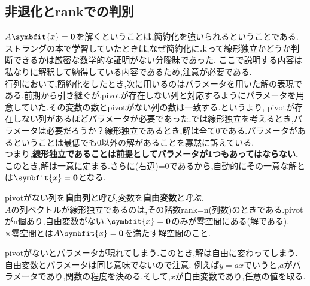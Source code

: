 \subsection{非退化とrankでの判別}\label{sub:nondegenerate}
$A\symbfit{x}=\mathbf{0}$を解くということは,簡約化を強いられるということである.
ストラングの本で学習していたときは,なぜ簡約化によって線形独立かどうか判断できるかは厳密な数学的な証明がない分曖昧であった.
ここで説明する内容は私なりに解釈して納得している内容であるため,注意が必要である.\\
行列において,簡約化をしたとき,次に用いるのはパラメータを用いた解の表現である.前期から引き継ぐが,pivotが存在しない列と対応するようにパラメータを用意していた.その変数の数とpivotがない列の数は一致する.というより,
pivotが存在しない列があるほどパラメータが必要であった.では線形独立を考えるとき,パラメータは必要だろうか？線形独立であるとき,解は全て0である.パラメータがあるということは最低でも0以外の解があることを寡黙に訴えている.\\
つまり,\textbf{線形独立であることは前提としてパラメータが1つもあってはならない.}このとき,解は一意に定まる.さらに(右辺)=0であるから,自動的にその一意な解とは$\symbfit{x}=\mathbf{0}$となる.\\
\begin{tcolorbox}[colframe=black!80,colback=white,title=列について非退化]
\hspace{1em}pivotがない列を\textbf{自由列}と呼び,変数を\textbf{自由変数}と呼ぶ.\\
$A$の列ベクトルが線形独立であるのは,その階数rank=n(列数)のときである.pivotがn個あり,自由変数がない.$\symbfit{x}=\mathbf{0}$のみが零空間にある(解である).\\
※零空間とは$A\symbfit{x}=\mathbf{0}$を満たす解空間のこと.
\end{tcolorbox}
pivotがないとパラメータが現れてしまう.このとき,解は\underline{自由}に変わってしまう.\\
自由変数とパラメータは同じ意味でないので注意.
例えば$y=ax$でいうと,$a$がパラメータであり,関数の程度を決める.そして,$x$が自由変数であり,任意の値を取る.

